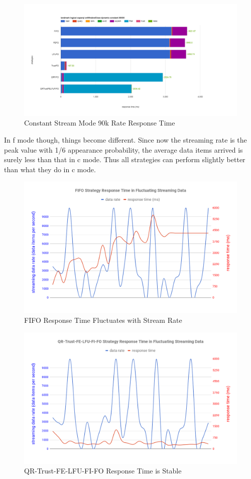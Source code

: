 \begin{figure}[!htbp]
	\centering
    \includegraphics[width=6.5in]{img/6-9wt.png}
    \caption{Constant Stream Mode 90k Rate Response Time}
    \label{fig:6-csmrrt9}
\end{figure}

In f mode though, things become different. 
Since now the streaming rate is the peak value with 1/6 appearance probability, the average data items arrived is surely less than that in c mode. 
Thus all strategies can perform slightly better than what they do in c mode. 

\begin{figure}[!htbp]
	\centering
    \includegraphics[width=5in]{img/6-fluctuating.png}
    \caption{FIFO Response Time Fluctuates with Stream Rate}
    \label{fig:6-fluc}
\end{figure}

\begin{figure}[!htbp]
	\centering
    \includegraphics[width=5in]{img/6-flat.png}
    \caption{QR-Trust-FE-LFU-FI-FO Response Time is Stable}
   	\label{fig:6-flat}
\end{figure}

